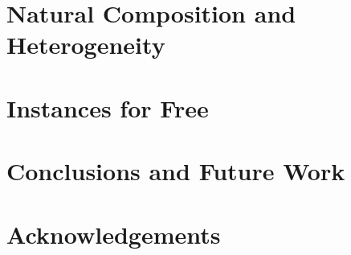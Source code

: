 \documentclass[a4paper]{article}
\begin{document}
\section{Natural Composition and Heterogeneity}

\section{Instances for Free}

\section{Conclusions and Future Work}

\section{Acknowledgements}

{}

\end{document}
